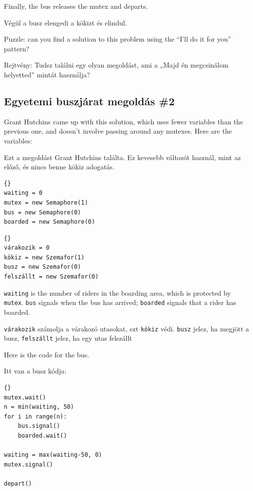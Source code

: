 \documentclass{book}
\newcommand{\clearemptydoublepage}{\newpage\cleardoublepage}
\begin{document}
Finally, the bus releases the mutex and departs.

Végül a busz elengedi a kökizt és elindul.

Puzzle: can you find a solution to this problem using the
``I'll do it for you'' pattern?

Rejtvény: Tudsz találni egy olyan megoldást, ami a
„Majd én megcsinálom helyetted” mintát használja?

\clearemptydoublepage
\subsection{Egyetemi buszjárat megoldás \#2}

Grant Hutchins came up with this solution, which uses fewer
variables than the previous one, and doesn't involve passing
around any mutexes.  Here are the variables:

Ezt a megoldást Grant Hutchins találta. Ez kevesebb változót
használ, mint az előző, és nincs benne kökiz adogatás.

\begin{lstlisting}[title={Bus problem solution \#2 (initialization)}]{}
waiting = 0
mutex = new Semaphore(1)
bus = new Semaphore(0)
boarded = new Semaphore(0)
\end{lstlisting}

\begin{lstlisting}[title={Egyetemi buszjárat megoldás \#2 (inicializáció)}]{}
várakozik = 0
kökiz = new Szemafor(1)
busz = new Szemafor(0)
felszállt = new Szemafor(0)
\end{lstlisting}

{\tt waiting} is the number of riders in the boarding area,
which is protected by {\tt mutex}.  {\tt bus} signals when the
bus has arrived; {\tt boarded} signals that a rider has boarded.

{\tt várakozik} számolja a várakozó utasokat, ezt {\tt kökiz} védi.
{\tt busz} jelez, ha megjött a busz, {\tt felszállt} jelez, ha
egy utas felszállt

Here is the code for the bus.

Itt van a busz kódja:

\begin{lstlisting}[title={Bus problem solution (bus)}]{}
mutex.wait()
n = min(waiting, 50)
for i in range(n):
    bus.signal()
    boarded.wait()

waiting = max(waiting-50, 0)
mutex.signal()

depart()
\end{lstlisting}
\end{document}
